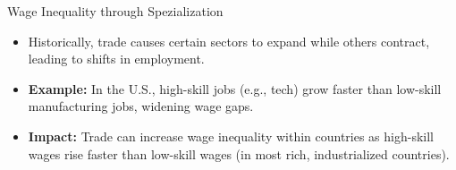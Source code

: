 \documentclass{beamer}
\begin{document}
\begin{frame}{Wage Inequality through Spezialization}
    \begin{itemize}
        \item Historically, trade causes certain sectors to expand while others contract, leading to shifts in employment.
        \item \textbf{Example:} In the U.S., high-skill jobs (e.g., tech) grow faster than low-skill manufacturing jobs, widening wage gaps.
        \item \textbf{Impact:} Trade can increase wage inequality within countries as high-skill wages rise faster than low-skill wages (in most rich, industrialized countries).
    \end{itemize}
\end{frame}
\end{document}
